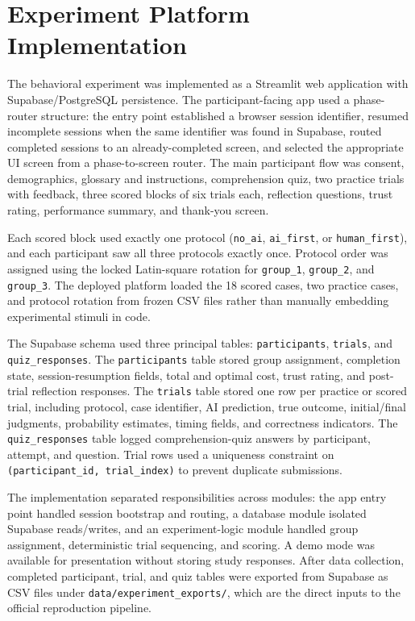\documentclass[conference]{IEEEtran}
\begin{document}
\appendices
\section{Experiment Platform Implementation}
\label{app:platform}

The behavioral experiment was implemented as a Streamlit web application
with Supabase/PostgreSQL persistence. The participant-facing app used a
phase-router structure: the entry point established a browser session
identifier, resumed incomplete sessions when the same identifier was found
in Supabase, routed completed sessions to an already-completed screen, and
selected the appropriate UI screen from a phase-to-screen router. The main
participant flow was consent, demographics, glossary and instructions,
comprehension quiz, two practice trials with feedback, three scored blocks
of six trials each, reflection questions, trust rating, performance
summary, and thank-you screen.

Each scored block used exactly one protocol
(\texttt{no\_ai}, \texttt{ai\_first}, or \texttt{human\_first}), and each
participant saw all three protocols exactly once. Protocol order was
assigned using the locked Latin-square rotation for \texttt{group\_1},
\texttt{group\_2}, and \texttt{group\_3}. The deployed platform loaded the
18 scored cases, two practice cases, and protocol rotation from frozen CSV
files rather than manually embedding experimental stimuli in code.

The Supabase schema used three principal tables:
\texttt{participants}, \texttt{trials}, and
\texttt{quiz\_responses}. The \texttt{participants} table stored group
assignment, completion state, session-resumption fields, total and optimal
cost, trust rating, and post-trial reflection responses. The
\texttt{trials} table stored one row per practice or scored trial,
including protocol, case identifier, AI prediction, true outcome,
initial/final judgments, probability estimates, timing fields, and
correctness indicators. The \texttt{quiz\_responses} table logged
comprehension-quiz answers by participant, attempt, and question. Trial
rows used a uniqueness constraint on \texttt{(participant\_id,
trial\_index)} to prevent duplicate submissions.

The implementation separated responsibilities across modules: the app
entry point handled session bootstrap and routing, a database module
isolated Supabase reads/writes, and an experiment-logic module handled
group assignment, deterministic trial sequencing, and scoring. A demo mode
was available for presentation without storing study responses. After data
collection, completed participant, trial, and quiz tables were exported
from Supabase as CSV files under \texttt{data/experiment\_exports/}, which
are the direct inputs to the official reproduction pipeline.



\end{document}
